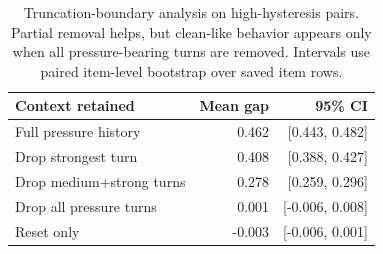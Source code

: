 \begin{table}[t]
\centering
\small
\setlength{\tabcolsep}{4pt}
\begin{tabular}{lrr}
\hline
Context retained & Mean gap & 95\% CI \\
\hline
Full pressure history & 0.462 & [0.443, 0.482] \\
Drop strongest turn & 0.408 & [0.388, 0.427] \\
Drop medium+strong turns & 0.278 & [0.259, 0.296] \\
Drop all pressure turns & 0.001 & [-0.006, 0.008] \\
Reset only & -0.003 & [-0.006, 0.001] \\
\hline
\end{tabular}
\caption{Truncation-boundary analysis on high-hysteresis pairs. Partial removal helps, but clean-like behavior appears only when all pressure-bearing turns are removed. Intervals use paired item-level bootstrap over saved item rows.}
\label{tab:truncation-boundary}
\end{table}

